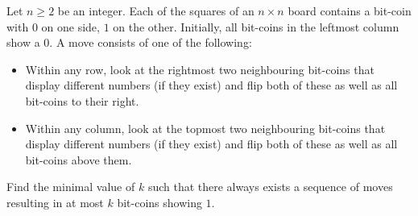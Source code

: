 Let $n \geq 2$ be an integer.
Each of the squares of an $n \times n$ board contains a bit-coin with $0$ on one side, $1$ on the other.
Initially, all bit-coins in the leftmost column show a $0$.
A move consists of one of the following:
\begin{itemize}
    \item Within any row, look at the rightmost two neighbouring bit-coins that display different numbers
    (if they exist) and flip both of these as well as all bit-coins to their right.
    \item Within any column, look at the topmost two neighbouring bit-coins that display different numbers
    (if they exist) and flip both of these as well as all bit-coins above them.
\end{itemize}
Find the minimal value of $k$ such that there always exists a sequence of moves resulting in
at most $k$ bit-coins showing $1$.
